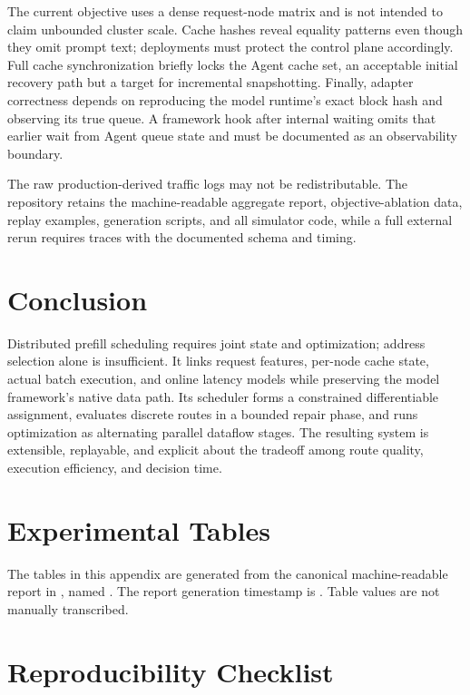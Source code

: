 \documentclass[10pt]{article}
\begin{document}
The current objective uses a dense request-node matrix and is not intended to
claim unbounded cluster scale. Cache hashes reveal equality patterns even
though they omit prompt text; deployments must protect the control plane
accordingly. Full cache synchronization briefly locks the Agent cache set, an
acceptable initial recovery path but a target for incremental snapshotting.
Finally, adapter correctness depends on reproducing the model runtime's exact
block hash and observing its true queue. A framework hook after internal
waiting omits that earlier wait from Agent queue state and must be documented
as an observability boundary.

The raw production-derived traffic logs may not be redistributable. The
repository retains the machine-readable aggregate report, objective-ablation
data, replay examples, generation scripts, and all simulator code, while a
full external rerun requires traces with the documented schema and timing.

\section{Conclusion}

Distributed prefill scheduling requires joint state and optimization; address
selection alone is insufficient. It links request
features, per-node cache state, actual batch execution, and online latency
models while preserving the model framework's native data path. Its scheduler
forms a constrained differentiable assignment, evaluates discrete routes in a
bounded repair phase, and runs optimization as alternating parallel dataflow
stages. The resulting system is extensible, replayable, and explicit about the
tradeoff among route quality, execution efficiency, and decision time.

\appendix
\section{Experimental Tables}



The tables in this appendix are generated from the canonical machine-readable
report in , named
.
The report generation timestamp is
\ExperimentGeneratedAt. Table values are not manually transcribed.

\section{Reproducibility Checklist}
\end{document}

